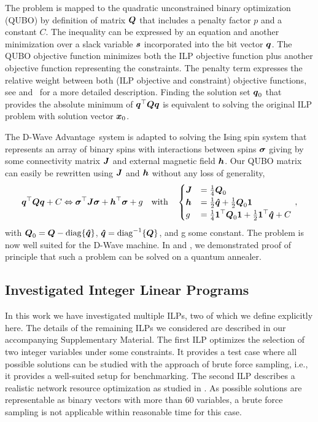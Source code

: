 \documentclass[utf8, nocrop]{FrontiersinHarvardArxiv}
\def\diag{\mathrm{diag}}
\def\ve#1{\mathlette{\boldmath}{#1}}
\def\mathlette#1#2{{\mathchoice{\mbox{#1$\displaystyle #2$}}%
        {\mbox{#1$\textstyle #2$}}%
        {\mbox{#1$\scriptstyle #2$}}%
        {\mbox{#1$\scriptscriptstyle #2$}}}}
\begin{document}
The problem is mapped to the quadratic unconstrained binary optimization (QUBO) by definition of matrix $\ve Q$ that includes a penalty factor $p$ and a constant $C$.
The inequality can be expressed by an equation and another minimization over a slack variable $\ve{s}$ incorporated into the bit vector $\ve{q}$.
The QUBO objective function minimizes both the ILP objective function plus another objective function representing the constraints.
The penalty term expresses the relative weight between both (ILP objective and constraint) objective functions, see \cite{Chang:2020iwh} and~\cite{Witt:2022lsx} for a more detailed description.  Finding the solution set $\ve{q}_0$ that provides the absolute minimum of $\ve{q}^\top\ve{Q}\ve{q}$ is equivalent to solving the original ILP problem with solution vector $\ve{x}_0$.

The D-Wave Advantage\texttrademark\  system is adapted to solving the Ising spin system that represents an array of binary spins with interactions between spins $\ve{\sigma}$ giving by some connectivity matrix $\ve{J}$ and external magnetic field $\ve{h}$.  Our QUBO matrix can easily be rewritten using $\ve{J}$ and $\ve{h}$ without any loss of generality, 
\begin{equation}
    \ve{q}^\top \ve{Q} \ve{q}+ C
    \Leftrightarrow
    \ve{\sigma}^\top \ve{J} \ve{\sigma}
    +
    \ve{h}^\top \ve{\sigma}
    +
    g
    \text{\quad with\quad }
    \begin{cases}
        \ve{J} &= \frac{1}{4} \ve Q_0\\
        \ve{h} &= \frac{1}{2} \ve{\hat{q}} + \frac{1}{2} \ve Q_0\ve{1} \\
        g &= \frac{1}{4}\ve{1}^\top \ve Q_0 \ve 1 + \frac{1}{2} \ve 1^\top \ve{\hat{q}}+ C \\
    \end{cases}
    \,,
\end{equation}
with  $\ve Q_0 = \ve  Q - \diag\{\ve{\hat{q}}\}$, $\ve{\hat{q}} = \diag^{-1}\{\ve Q\}$, and g some constant.
The problem is now well suited for the D-Wave machine.
In \cite{Chang:2020iwh} and \cite{Witt:2022lsx}, we demonstrated proof of principle that such a problem can be solved on a quantum annealer.

\subsection{Investigated Integer Linear Programs}
In this work we have investigated multiple ILPs, two of which we define explicitly here.  
The details of the remaining ILPs we considered are described in our accompanying Supplementary Material.
The first ILP optimizes the selection of two integer variables under some constraints. It provides a test case where all possible solutions can be studied with the approach of brute force sampling, i.e., it provides a well-suited setup for benchmarking. The second ILP describes a realistic network resource optimization as studied in \cite{Witt:2022lsx}. As possible solutions are representable as binary vectors with more than 60 variables, a brute force sampling is not applicable within reasonable time for this case.
\end{document}

